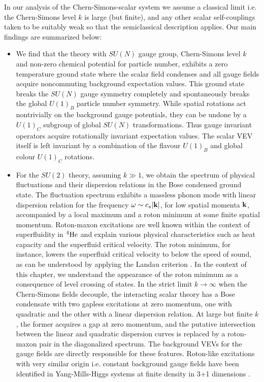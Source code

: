 In our analysis of the Chern-Simons-scalar system we  assume a classical limit i.e.  the Chern-Simons level $k$ is large (but finite), and any other scalar self-couplings taken to be  suitably weak so that the semiclassical description applies.  Our main findings are summarized below:
 \begin{itemize}
 \item{We find that the theory with $SU(N)$ gauge group, Chern-Simons level $k$ and non-zero chemical potential for particle number, exhibits a zero temperature ground state where  the scalar field condenses and all gauge fields acquire noncommuting background expectation values.  This ground state breaks the $SU(N)$ gauge symmetry completely and spontaneously breaks the global $U(1)_B$ particle number symmetry. While spatial rotations act nontrivially on the background gauge potentials, they  can be undone by a $U(1)_C$ subgroup of global $SU(N)$ transformations.  Thus gauge invariant operators acquire rotationally  invariant expectation values. The scalar VEV itself is left invariant by a combination of the flavour $U(1)_B$ and global colour $U(1)_C$ rotations. }
 \item{For the $SU(2)$ theory, assuming $k\gg 1$, we obtain the spectrum of physical fluctuations and their dispersion relations in the Bose condensed ground state. The fluctuation spectrum exhibits a massless phonon mode with linear dispersion relation 
 for the frequency $\omega\sim c_s |{\bf k}|$, for low spatial momenta ${\bf k}$, accompanied by a local maximum and a roton minimum at some finite spatial momentum.  Roton-maxon excitations are well known within the context of superfluidity in ${}^4{\rm He}$  \cite{Landau:1941vsj, Schmitt:2014eka} and explain various physical characteristics such as heat capacity and the superfluid critical velocity. The roton minimum, for instance, lowers the superfluid critical velocity to below the speed of sound, as can be understood by applying the Landau criterion \cite{Landau:1941vsj, Schmitt:2014eka}. In the context of this chapter, we understand the appearance of the roton minimum as a consequence of level crossing of states. In the strict limit $k\to \infty$ when the Chern-Simons fields decouple, the interacting scalar theory has a Bose condensate with two gapless excitations at zero momentum, one with quadratic and the other with a linear dispersion relation. At  large but finite $k$, the former acquires a gap at zero momentum, and the putative intersection between the linear and quadratic dispersion curves is replaced by a roton-maxon pair in the diagonalized spectrum. The background VEVs for the gauge fields are directly responsible for these features. Roton-like excitations with very similar origin i.e. constant background gauge fields have been identified in Yang-Mills-Higgs systems at finite density in 3+1 dimensions \cite{Gusynin:2003yu}.
 
}
\end{itemize}
